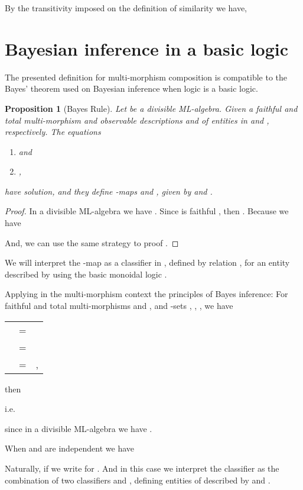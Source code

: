 \documentclass[oribibl]{llncs}
\newtheorem{prop}{Proposition}
\begin{document}
By the transitivity imposed on the definition of similarity we have,   

\section{Bayesian inference in a basic logic}\label{bayesian inference}
The presented definition for multi-morphism composition  is compatible to the Bayes' theorem used on Bayesian inference when   logic is a basic logic.

\begin{prop}[Bayes Rule]
Let  be a divisible ML-algebra. Given a faithful and total multi-morphism  and observable descriptions  and  of entities in  and , respectively. The equations
\begin{enumerate}
  \item  and
  \item ,
\end{enumerate}
have solution, and they define -maps  and , given by  and .
\end{prop}

\begin{proof}
In a divisible ML-algebra  we have . Since  is faithful , then . Because  we have

And, we can use the same strategy to proof  .
\end{proof}

We will interpret the -map  as a classifier in , defined by relation , for an entity described by  using the basic monoidal logic .

Applying in the multi-morphism context the principles of Bayes inference: For faithful and total multi-morphisms  and , and -sets , , , we have
\begin{center}
\begin{tabular}{rcl}
   & = &  \\
   & = & \\
   & = & , \\
\end{tabular}
\end{center}
then

i.e.

since in a divisible ML-algebra  we have .

When  and  are independent we have

Naturally, if  we write  for . And in this case we interpret the classifier   as the combination of two classifiers  and , defining entities of  described by  and .
\end{document}
